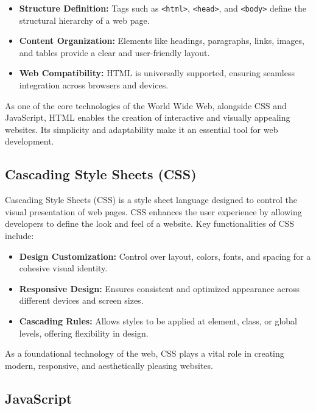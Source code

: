 \begin{itemize}
    \item \textbf{Structure Definition:} Tags such as \texttt{<html>}, \texttt{<head>}, and \texttt{<body>} define the structural hierarchy of a web page.
    \item \textbf{Content Organization:} Elements like headings, paragraphs, links, images, and tables provide a clear and user-friendly layout.
    \item \textbf{Web Compatibility:} HTML is universally supported, ensuring seamless integration across browsers and devices.
\end{itemize}

As one of the core technologies of the World Wide Web, alongside CSS and JavaScript, HTML enables the creation of interactive and visually appealing websites. Its simplicity and adaptability make it an essential tool for web development.

\cite{HTML-Wikipedia}

\subsection{Cascading Style Sheets (CSS)}

Cascading Style Sheets (CSS) is a style sheet language designed to control the visual presentation of web pages. CSS enhances the user experience by allowing developers to define the look and feel of a website. Key functionalities of CSS include:

\begin{itemize}
    \item \textbf{Design Customization:} Control over layout, colors, fonts, and spacing for a cohesive visual identity.
    \item \textbf{Responsive Design:} Ensures consistent and optimized appearance across different devices and screen sizes.
    \item \textbf{Cascading Rules:} Allows styles to be applied at element, class, or global levels, offering flexibility in design.
\end{itemize}

As a foundational technology of the web, CSS plays a vital role in creating modern, responsive, and aesthetically pleasing websites.

\cite{CSS-Wikipedia}

\subsection{JavaScript}

